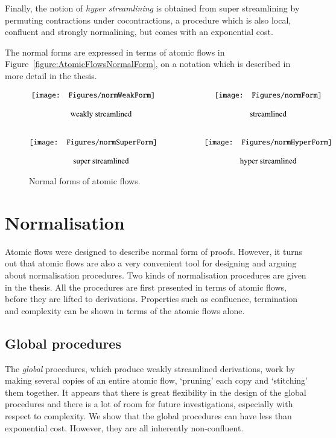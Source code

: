 Finally, the notion of \emph{hyper streamlining} is obtained from super streamlining by permuting contractions under cocontractions, a procedure which is also local, confluent and strongly normalining, but comes with an exponential cost.

The normal forms are expressed in terms of atomic flows in Figure~\vref{figure:AtomicFlowsNormalForm}, on a notation which is described in more detail in the thesis.

\begin{figure}
\[
\begin{array}{@{}c@{\qquad\qquad}c@{}}
\vcenter{\hbox{\texttt{[image: Figures/normWeakForm]}}}
\qquad&
\vcenter{\hbox{\texttt{[image: Figures/normForm]}}}
\\
\noalign{\bigskip}
\mbox{weakly streamlined}&\mbox{streamlined}
\\
\noalign{\bigskip\bigskip}
\vcenter{\hbox{\texttt{[image: Figures/normSuperForm]}}}
\qquad&
\vcenter{\hbox{\texttt{[image: Figures/normHyperForm]}}}
\\
\noalign{\bigskip}
\mbox{super streamlined}&\mbox{hyper streamlined}
\end{array}
\]
\caption{Normal forms of atomic flows.}
\label{figure:AtomicFlowsNormalForm}
\end{figure}

\section{Normalisation}

Atomic flows were designed to describe normal form of proofs. However, it turns out that atomic flows are also a very convenient tool for designing and arguing about normalisation procedures. Two kinds of normalisation procedures are given in the thesis. All the procedures are first presented in terms of atomic flows, before they are lifted to derivations. Properties such as confluence, termination and complexity can be shown in terms of the atomic flows alone.

\subsection{Global procedures}

The \emph{global} procedures, which produce weakly streamlined derivations, work by making several copies of an entire atomic flow, `pruning' each copy and `stitching' them together. It appears that there is great flexibility in the design of the global procedures and there is a lot of room for future investigations, especially with respect to complexity. We show that the global procedures can have less than exponential cost. However, they are all inherently non-confluent.


